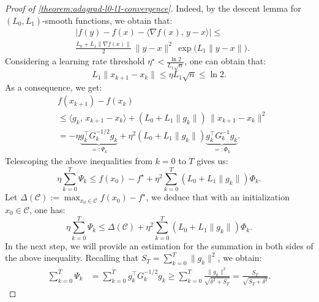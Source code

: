 \documentclass{article}
\theoremstyle{plain}
\theoremstyle{definition}
\theoremstyle{remark}
\newcommand{\ip}[2]{\langle #1,\, #2 \rangle}
\newcommand{\norm}[1]{\| #1 \|}
\begin{document}
\begin{proof}[Proof of \cref{theorem:adagrad-l0-l1-convergence}]
    Indeed, by the descent lemma for $(L_0,L_1)$-smooth functions, we obtain that:
    \begin{equation*}
        \begin{aligned}
            &\bigl|f(y) - f(x) - \ip{\nabla f(x)}{y-x}\bigr| \leq \\ &\frac{L_0 + L_1\norm{\nabla f(x)}}{2} \,\|y - x\|^2 \,\exp\bigl(L_1\norm{y-x}\bigr).
        \end{aligned}
    \end{equation*}
    Considering a learning rate threshold $\eta^\star < \frac{\ln 2}{L_1\sqrt{n}}$, one can obtain that:
    \begin{equation*}
        L_1\|x_{k+1}-x_k\| \leq \eta L_1\sqrt{n} \leq \ln 2.
    \end{equation*}
    As a consequence, we get:
    \begin{equation}
        \label{eq:l0-l1-descent-lemma-adagrad}
        \begin{aligned}
            &f(x_{k + 1}) - f(x_k) \\ 
            &\leq \ip{g_k}{x_{k + 1}-x_k}
            + (L_0 + L_1\norm{g_k}) \,\|x_{k+1} - x_k\|^2\\
            &= -\eta \underbrace{g_k^\top G_k^{-1/2} g_k}_{=: \Psi_k} + \eta^2 (L_0 + L_1\norm{g_k}) \underbrace{g_k^\top G_k^{-1}g_k}_{=: \Phi_k}.
        \end{aligned}
    \end{equation}
    Telescoping the above inequalities from $k = 0$ to $T$ gives us:
    \begin{equation}
        \label{eq:telescope-version-1}
        \eta \sum_{k = 0}^T \Psi_k \leq {f(x_0) - f^\star} + \eta^2 \sum_{k = 0}^T (L_0 + L_1\|g_k\|) \Phi_k.
    \end{equation}
    Let $\Delta(\mathcal{C}):= \max_{x_0 \in \mathcal{C}} f(x_0) - f^\star$, we deduce that with an initialization $x_0 \in \mathcal{C}$, one has:
    \begin{equation*}
        \eta \sum_{k = 0}^T \Psi_k \leq \Delta(\mathcal{C}) + \eta^2 \sum_{k = 0}^T (L_0 + L_1\|g_k\|) \Phi_k.
    \end{equation*}
    In the next step, we will provide an estimation for the summation in both sides of the above inequality. Recalling that $S_{T} = \sum_{k = 0}^T \|g_k\|^2$, we obtain:
    \begin{equation*}
        \begin{aligned}
            \sum_{k=0}^T \Psi_k &= \sum_{k=0}^T g_k^\top G_k^{-1/2}g_k \geq \sum_{k = 0}^T \frac{\|g_k\|^2}{\sqrt{\delta^2 + S_T}} = \frac{S_T}{\sqrt{S_T + \delta^2}}.

\end{aligned}
\end{equation*}
\end{proof}
\end{document}
